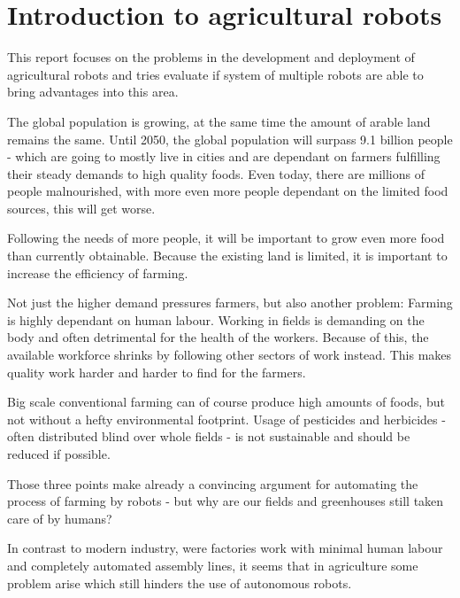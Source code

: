 \newcommand*\rot{\rotatebox{90}}

    \chapter{Introduction to agricultural robots}

    This report focuses on the problems in the development and deployment of agricultural robots and tries evaluate if system of multiple robots are able to bring advantages into this area.

    The global population is growing, at the same time the amount of arable land remains the same. Until 2050, the global population will surpass 9.1 billion people - which are going to mostly live in cities and are dependant on farmers fulfilling their steady demands to high quality foods. Even today, there are millions of people malnourished, with more even more people dependant on the limited food sources, this will get worse. \cite{FAO2021}
    
    Following the needs of more people, it will be important to grow even more food than currently obtainable. Because the existing land is limited, it is important to increase the efficiency of farming. 

    Not just the higher demand pressures farmers, but also another problem: Farming is highly dependant on human labour. Working in fields is demanding on the body and often detrimental for the health of the workers. Because of this, the available workforce shrinks by following other sectors of work instead. This makes quality work harder and harder to find for the farmers. \cite{Vasconez2019}

    Big scale conventional farming can of course produce high amounts of foods, but not without a hefty environmental footprint. Usage of pesticides and herbicides - often distributed blind over whole fields - is not sustainable and should be reduced if possible. \cite{ConesaMunoz2015}

    Those three points make already a convincing argument for automating the process of farming by robots - but why are our fields and greenhouses still taken care of by humans? 

    In contrast to modern industry, were factories work with minimal human labour and completely automated assembly lines, it seems that in agriculture some problem arise which still hinders the use of autonomous robots. 

